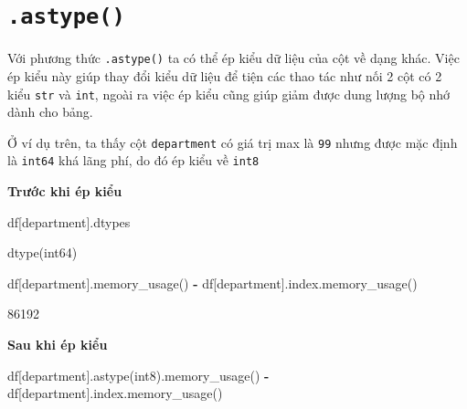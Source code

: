 \documentclass[
]{book}
\newenvironment{Shaded}{\begin{snugshade}}{\end{snugshade}}
\newcommand{\NormalTok}[1]{#1}
\newcommand{\OperatorTok}[1]{\textcolor[rgb]{0.81,0.36,0.00}{\textbf{#1}}}
\newcommand{\StringTok}[1]{\textcolor[rgb]{0.31,0.60,0.02}{#1}}
\begin{document}
\section{\texorpdfstring{\texttt{.astype()}}{.astype()}}\label{astype}

Với phương thức \texttt{.astype()} ta có thể ép kiểu dữ liệu của cột về dạng khác. Việc ép kiểu này giúp thay đổi kiểu dữ liệu để tiện các thao tác như nối 2 cột có 2 kiểu \texttt{str} và \texttt{int}, ngoài ra việc ép kiểu cũng giúp giảm được dung lượng bộ nhớ dành cho bảng.

Ở ví dụ trên, ta thấy cột \texttt{department} có giá trị max là \texttt{99} nhưng được mặc định là \texttt{int64} khá lãng phí, do đó ép kiểu về \texttt{int8}

\textbf{Trước khi ép kiểu}

\begin{Shaded}
\begin{Highlighting}[]
\NormalTok{df[}\StringTok{\textquotesingle{}department\textquotesingle{}}\NormalTok{].dtypes}
\end{Highlighting}
\end{Shaded}

\begin{Shaded}
\begin{Highlighting}[]
\NormalTok{dtype(\textquotesingle{}int64\textquotesingle{})}
\end{Highlighting}
\end{Shaded}

\begin{Shaded}
\begin{Highlighting}[]
\NormalTok{df[}\StringTok{\textquotesingle{}department\textquotesingle{}}\NormalTok{].memory\_usage() }\OperatorTok{{-}}\NormalTok{ df[}\StringTok{\textquotesingle{}department\textquotesingle{}}\NormalTok{].index.memory\_usage()}
\end{Highlighting}
\end{Shaded}

\begin{Shaded}
\begin{Highlighting}[]
\NormalTok{86192}
\end{Highlighting}
\end{Shaded}

\textbf{Sau khi ép kiểu}

\begin{Shaded}
\begin{Highlighting}[]
\NormalTok{df[}\StringTok{\textquotesingle{}department\textquotesingle{}}\NormalTok{].astype(}\StringTok{\textquotesingle{}int8\textquotesingle{}}\NormalTok{).memory\_usage() }\OperatorTok{{-}}\NormalTok{ df[}\StringTok{\textquotesingle{}department\textquotesingle{}}\NormalTok{].index.memory\_usage()}
\end{Highlighting}
\end{Shaded}
\end{document}
